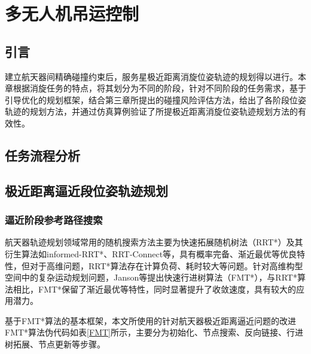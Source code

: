 \documentclass[lang=chs, degree=master, blindreview=false, winfonts=true]{yanputhesis}
\begin{document}
\cleardoublepage

\chapter{多无人机吊运控制}

\section{引言}
建立航天器间精确碰撞约束后，服务星极近距离消旋位姿轨迹的规划得以进行。本章根据消旋任务的特点，将其划分为不同的阶段，针对不同阶段的任务需求，基于引导优化的规划框架，结合第三章所提出的碰撞风险评估方法，给出了各阶段位姿轨迹的规划方法，并通过仿真算例验证了所提极近距离消旋位姿轨迹规划方法的有效性。

\section{任务流程分析}




\section{极近距离逼近段位姿轨迹规划}
\subsection{逼近阶段参考路径搜索}
航天器轨迹规划领域常用的随机搜索方法主要为快速拓展随机树法（RRT*）及其衍生算法如informed-RRT*、RRT-Connect等，具有概率完备、渐近最优等优良特性，但对于高维问题，RRT*算法存在计算负荷、耗时较大等问题。针对高维构型空间中的复杂运动规划问题，Janson等提出快速行进树算法（FMT*）\cite{jansonFastMarchingTree2015}，与RRT*算法相比，FMT*保留了渐近最优等特性，同时显著提升了收敛速度，具有较大的应用潜力。

基于FMT*算法的基本框架，本文所使用的针对航天器极近距离逼近问题的改进FMT*算法伪代码如表\ref{FMT}所示，主要分为初始化、节点搜索、反向链接、行进树拓展、节点更新等步骤。
\end{document}
